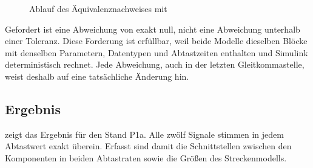 \begin{figure}[htbp]
  \centering
  \caption{Ablauf des Äquivalenznachweises mit }
  \label{fig:aequivalenz}
\end{figure}

Gefordert ist eine Abweichung von exakt null, nicht eine Abweichung unterhalb einer
Toleranz. Diese Forderung ist erfüllbar, weil beide Modelle dieselben Blöcke mit denselben
Parametern, Datentypen und Abtastzeiten enthalten und Simulink deterministisch rechnet.
Jede Abweichung, auch in der letzten Gleitkommastelle, weist deshalb auf eine tatsächliche
Änderung hin.

\subsection{Ergebnis}

 zeigt das Ergebnis für den Stand P1a. Alle zwölf Signale stimmen
in jedem Abtastwert exakt überein. Erfasst sind damit die Schnittstellen zwischen den
Komponenten in beiden Abtastraten sowie die Größen des Streckenmodells.

